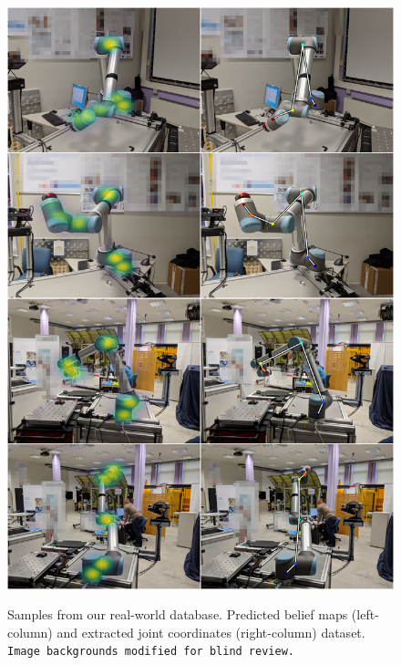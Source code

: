 \documentclass[conference]{IEEEtran}
\begin{document}
\begin{figure}[htbp]
{                \includegraphics[width=0.98\columnwidth]{figures/results/ur10_lab/mosaic_blind.png}
            \fi
            }
        \caption{
            \label{fig:posresults} Samples from our real-world database. Predicted belief maps (left-column) and extracted joint coordinates (right-column) dataset. 
            \iffinalcopy
            \else
                \texttt{Image backgrounds modified for blind review.}
            \fi
        }
    \end{figure}
\end{document}
